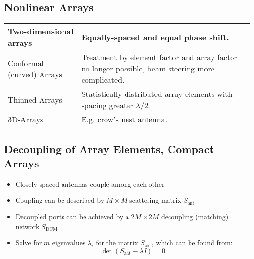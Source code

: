 \subsection{Nonlinear Arrays}
\begin{tabular}{p{2.5cm}p{4.5cm}}
    \toprule
    Two-dimensional arrays & Equally-spaced and equal phase shift.\\\midrule
    Conformal (curved) Arrays & Treatment by element factor and array factor no longer possible, beam-steering more complicated.\\\midrule
    Thinned Arrays & Statistically distributed array elements with spacing greater $\lambda/2$.\\\midrule
    3D-Arrays & E.g. crow's nest antenna.\\
    \bottomrule
\end{tabular}

\subsection{Decoupling of Array Elements, Compact Arrays}
\begin{itemize}
    \itemsep0pt
    \item Closely spaced antennas couple among each other
    \item Coupling can be described by $M\times M$ scattering matrix $S_{\mathrm{ant}}$
    \item Decoupled ports can be achieved by a $2M\times 2M$ decoupling (matching) network $S_{\mathrm{DCM}}$
    \item Solve for $m$ eigenvalues $\lambda_i$ for the matrix $S_{\mathrm{ant}}$, which can be found from:
        \begin{equation*}
            \det(S_{\mathrm{ant}} - \lambda I) = 0
        \end{equation*}
\end{itemize}
